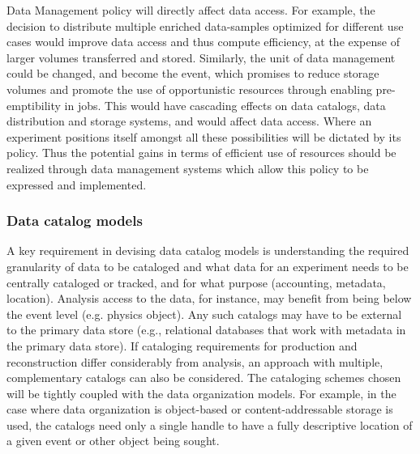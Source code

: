 \documentclass[12pt,a4paper]{article}
\begin{document}
Data Management policy will directly affect data access. For example,
the decision to distribute multiple enriched data-samples optimized for
different use cases would improve data access and thus compute
efficiency, at the expense of larger volumes transferred and stored.
Similarly, the unit of data management could be changed, and become the
event, which promises to reduce storage volumes and promote the use of
opportunistic resources through enabling pre-emptibility in jobs. This
would have cascading effects on data catalogs, data distribution and
storage systems, and would affect data access. Where an experiment
positions itself amongst all these possibilities will be dictated by its
policy. Thus the potential gains in terms of efficient use of resources
should be realized through data management systems which allow this
policy to be expressed and implemented.

\subsubsection{Data catalog models}\label{data-catalog-models}

A key requirement in devising data catalog models is understanding the
required granularity of data to be cataloged and what data for an
experiment needs to be centrally cataloged or tracked, and for what
purpose (accounting, metadata, location). Analysis access to the data,
for instance, may benefit from being below the event level (e.g. physics
object). Any such catalogs may have to be external to the primary data
store (e.g., relational databases that work with metadata in the primary
data store). If cataloging requirements for production and
reconstruction differ considerably from analysis, an approach with
multiple, complementary catalogs can also be considered. The cataloging
schemes chosen will be tightly coupled with the data organization
models. For example, in the case where data organization is object-based
or content-addressable storage is used, the catalogs need only a single
%
%
handle to have a fully descriptive location of a given event or other
object being sought.
%
%
\end{document}

